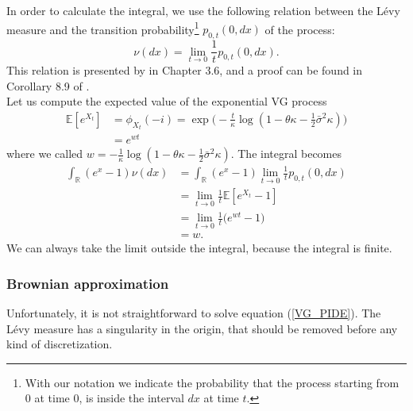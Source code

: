 \documentclass[a4paper,10pt]{article}
\newcommand{\numberset}{\mathbb}
\newcommand{\R}{\numberset{R}}
\newcommand{\E}{\numberset{E}}
\begin{document}
In order to calculate the integral, we use the following relation between the Lévy measure and the transition probability\footnote{With our notation we indicate the 
probability that the process starting from $0$ at time $0$, is inside the interval $dx$ at time $t$.} 
$p_{0,t}(0,dx)$ of the process:
\begin{equation}
 \nu(dx) = \lim_{t\to 0} \frac{1}{t} p_{0,t}(0,dx).
\end{equation}
This relation is presented by \cite{Cont} in Chapter 3.6, and a proof can be found in Corollary 8.9 of \cite{Sato}. \\
Let us compute the expected value of the exponential VG process
\begin{align*}
\E[ e^{X_t}] &= \phi_{X_t}(-i) = \exp \biggl( -\frac{t}{\kappa} \log(1-\theta \kappa -\frac{1}{2}\bar\sigma^2 \kappa ) \biggr)\\
 &= e^{w t}
\end{align*}
where we called $w = - \frac{1}{\kappa} \log(1-\theta \kappa -\frac{1}{2}\bar\sigma^2 \kappa)$.
The integral becomes
\begin{align*}
 \int_{\R} (e^x-1) \nu(dx) &= \int_{\R} (e^x-1) \lim_{t\to 0} \frac{1}{t} p_{0,t}(0,dx) \\ 
         &= \lim_{t\to 0} \frac{1}{t} \E[ e^{X_t} - 1 ] \\
         &= \lim_{t\to 0} \frac{1}{t} \biggl( e^{w t} - 1 \biggr) \\
         &= w.
\end{align*}
We can always take the limit outside the integral, because the integral is finite.


\subsubsection{Brownian approximation}

Unfortunately, it is not straightforward to solve equation (\ref{VG_PIDE}). The Lévy measure has a singularity in the origin,
that should be removed before any kind of discretization.
\end{document}
